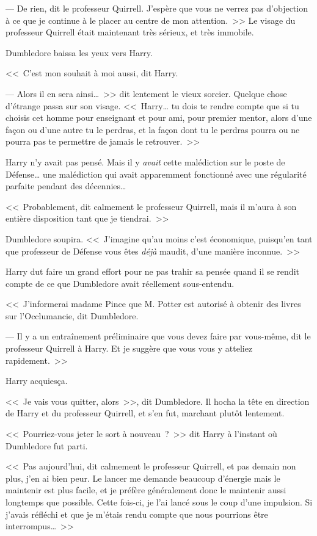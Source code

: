 --- De rien, dit le professeur Quirrell. J'espère que vous ne verrez pas d'objection à ce que je continue à le placer au centre de mon attention.~>> Le visage du professeur Quirrell était maintenant très sérieux, et très immobile.

Dumbledore baissa les yeux vers Harry.

<<~C'est mon souhait à moi aussi, dit Harry.

--- Alors il en sera ainsi…~>> dit lentement le vieux sorcier. Quelque chose d'étrange passa sur son visage. <<~Harry… tu dois te rendre compte que si tu choisis cet homme pour enseignant et pour ami, pour premier mentor, alors d'une façon ou d'une autre tu le perdras, et la façon dont tu le perdras pourra ou ne pourra pas te permettre de jamais le retrouver.~>>

Harry n'y avait pas pensé. Mais il y \emph{avait} cette malédiction sur le poste de Défense… une malédiction qui avait apparemment fonctionné avec une régularité parfaite pendant des décennies…

<<~Probablement, dit calmement le professeur Quirrell, mais il m'aura à son entière disposition tant que je tiendrai.~>>

Dumbledore soupira. <<~J'imagine qu'au moins c'est économique, puisqu'en tant que professeur de Défense vous êtes \emph{déjà} maudit, d'une manière inconnue.~>>

Harry dut faire un grand effort pour ne pas trahir sa pensée quand il se rendit compte de ce que Dumbledore avait réellement sous-entendu.

<<~J'informerai madame Pince que M. Potter est autorisé à obtenir des livres sur l'Occlumancie, dit Dumbledore.

--- Il y a un entraînement préliminaire que vous devez faire par vous-même, dit le professeur Quirrell à Harry. Et je suggère que vous vous y atteliez rapidement.~>>

Harry acquiesça.

<<~Je vais vous quitter, alors~>>, dit Dumbledore. Il hocha la tête en direction de Harry et du professeur Quirrell, et s'en fut, marchant plutôt lentement.

<<~Pourriez-vous jeter le sort à nouveau~?~>> dit Harry à l'instant où Dumbledore fut parti.

<<~Pas aujourd'hui, dit calmement le professeur Quirrell, et pas demain non plus, j'en ai bien peur. Le lancer me demande beaucoup d'énergie mais le maintenir est plus facile, et je préfère généralement donc le maintenir aussi longtemps que possible. Cette fois-ci, je l'ai lancé sous le coup d'une impulsion. Si j'avais réfléchi et que je m'étais rendu compte que nous pourrions être interrompus…~>>

